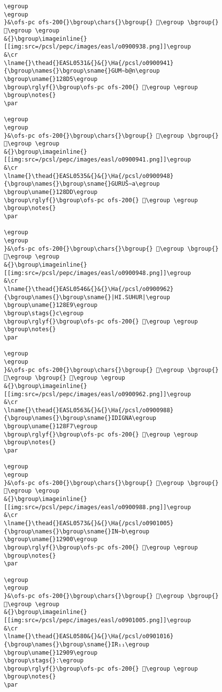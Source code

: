\begin{verbatim}
\egroup
\egroup
}&\ofs-pc ofs-200{}\bgroup\chars{}\bgroup{} 𒣔\egroup \bgroup{} 𒣗\egroup \egroup
&{}\bgroup\imageinline{}[[img:src=/pcsl/pepc/images/easl/o0900938.png]]\egroup
&\cr
\lname{}\thead{}EASL0531&{}&{}\Ha{/pcsl/o0900941}{\bgroup\names{}\bgroup\sname{}GUM∼b@n\egroup
\bgroup\uname{}128D5\egroup
\bgroup\rglyf{}\bgroup\ofs-pc ofs-200{} 𒣕\egroup \egroup
\bgroup\notes{}
\par 

\egroup
\egroup
}&\ofs-pc ofs-200{}\bgroup\chars{}\bgroup{} 𒣕\egroup \bgroup{} 𒣖\egroup \egroup
&{}\bgroup\imageinline{}[[img:src=/pcsl/pepc/images/easl/o0900941.png]]\egroup
&\cr
\lname{}\thead{}EASL0535&{}&{}\Ha{/pcsl/o0900948}{\bgroup\names{}\bgroup\sname{}GURUŠ∼a\egroup
\bgroup\uname{}128DD\egroup
\bgroup\rglyf{}\bgroup\ofs-pc ofs-200{} 𒣝\egroup \egroup
\bgroup\notes{}
\par 

\egroup
\egroup
}&\ofs-pc ofs-200{}\bgroup\chars{}\bgroup{} 𒣛\egroup \bgroup{} 𒣝\egroup \egroup
&{}\bgroup\imageinline{}[[img:src=/pcsl/pepc/images/easl/o0900948.png]]\egroup
&\cr
\lname{}\thead{}EASL0546&{}&{}\Ha{/pcsl/o0900962}{\bgroup\names{}\bgroup\sname{}|HI.SUHUR|\egroup
\bgroup\uname{}128E9\egroup
\bgroup\stags{}c\egroup
\bgroup\rglyf{}\bgroup\ofs-pc ofs-200{} 𒣩\egroup \egroup
\bgroup\notes{}
\par 

\egroup
\egroup
}&\ofs-pc ofs-200{}\bgroup\chars{}\bgroup{} 𒣧\egroup \bgroup{} 𒣨\egroup \bgroup{} 𒣩\egroup \egroup
&{}\bgroup\imageinline{}[[img:src=/pcsl/pepc/images/easl/o0900962.png]]\egroup
&\cr
\lname{}\thead{}EASL0563&{}&{}\Ha{/pcsl/o0900988}{\bgroup\names{}\bgroup\sname{}IDIGNA\egroup
\bgroup\uname{}128F7\egroup
\bgroup\rglyf{}\bgroup\ofs-pc ofs-200{} 𒣷\egroup \egroup
\bgroup\notes{}
\par 

\egroup
\egroup
}&\ofs-pc ofs-200{}\bgroup\chars{}\bgroup{} 𒣸\egroup \bgroup{} 𒣷\egroup \egroup
&{}\bgroup\imageinline{}[[img:src=/pcsl/pepc/images/easl/o0900988.png]]\egroup
&\cr
\lname{}\thead{}EASL0573&{}&{}\Ha{/pcsl/o0901005}{\bgroup\names{}\bgroup\sname{}IN∼b\egroup
\bgroup\uname{}12900\egroup
\bgroup\rglyf{}\bgroup\ofs-pc ofs-200{} 𒤀\egroup \egroup
\bgroup\notes{}
\par 

\egroup
\egroup
}&\ofs-pc ofs-200{}\bgroup\chars{}\bgroup{} 𒤀\egroup \bgroup{} 𒤁\egroup \egroup
&{}\bgroup\imageinline{}[[img:src=/pcsl/pepc/images/easl/o0901005.png]]\egroup
&\cr
\lname{}\thead{}EASL0580&{}&{}\Ha{/pcsl/o0901016}{\bgroup\names{}\bgroup\sname{}IR₁₁\egroup
\bgroup\uname{}12909\egroup
\bgroup\stags{}:\egroup
\bgroup\rglyf{}\bgroup\ofs-pc ofs-200{} 𒤉\egroup \egroup
\bgroup\notes{}
\par 


\end{verbatim}
